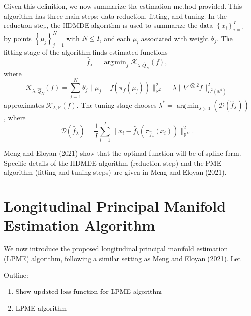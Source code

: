 \documentclass[11pt,reqno]{article}
\DeclareMathOperator*{\argmin}{arg\,min}
\begin{document}
Given this definition, we now summarize the estimation method provided. This algorithm has three main steps: data reduction, fitting, and tuning. In the reduction step, the HDMDE algorithm is used to summarize the data $\left\{x_i\right\}_{i=1}^{I}$ by points $\left\{\mu_j\right\}_{j=1}^{N}$ with $N \leq I$, and each $\mu_j$ associated with weight $\theta_j$. The fitting stage of the algorithm finds estimated functions 
\[%
  \hat{f}_\lambda = \argmin_f \mathcal{K}_{\lambda, \hat{Q}_N}(f)
,\]%
where 
\[%
  \mathcal{K}_{\lambda, \hat{Q}_N}(f) = \sum_{j = 1}^{N}\theta_j \|\mu_j - f(\pi_f(\mu_j))\|_{\mathbb{R}^{D}}^2 + \lambda\|\nabla^{\bigotimes 2}f\|_{L^2(\mathbb{R}^{d})}^2
\]%
approximates $\mathcal{K}_{\lambda, \mathbb{P}}(f)$. The tuning stage chooses $\lambda^{*} = \argmin_{\lambda > 0}(\mathcal{D}(\hat{f}_\lambda))$, where 
\[%
  \mathcal{D}(\hat{f}_\lambda) = \frac{1}{I}\sum_{i=1}^{I}\|x_i - \hat{f}_\lambda(\pi_{\hat{f}_\lambda}(x_i))\|_{\mathbb{R}^{D}}^2
.\]%

Meng and Eloyan (2021) show that the optimal function will be of spline form. Specific details of the HDMDE algorithm (reduction step) and the PME algorithm (fitting and tuning steps) are given in Meng and Eloyan (2021).

\section{Longitudinal Principal Manifold Estimation Algorithm}

We now introduce the proposed longitudinal principal manifold estimation (LPME) algorithm, following a similar setting as Meng and Eloyan (2021). Let 

Outline:
\begin{enumerate}
    \item Show updated loss function for LPME algorithm
    \item LPME algorithm
\end{enumerate}
\end{document}
